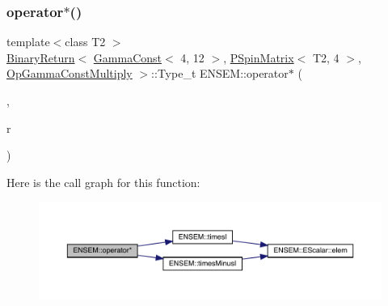 \subsubsection{\texorpdfstring{operator$\ast$()}{operator*()}\hspace{0.1cm}{\footnotesize\ttfamily [13/64]}}
{\footnotesize\ttfamily template$<$class T2 $>$ \\
\mbox{\hyperlink{structENSEM_1_1BinaryReturn}{Binary\+Return}}$<$ \mbox{\hyperlink{classENSEM_1_1GammaConst}{Gamma\+Const}}$<$ 4, 12 $>$, \mbox{\hyperlink{classENSEM_1_1PSpinMatrix}{P\+Spin\+Matrix}}$<$ T2, 4 $>$, \mbox{\hyperlink{structENSEM_1_1OpGammaConstMultiply}{Op\+Gamma\+Const\+Multiply}} $>$\+::Type\+\_\+t E\+N\+S\+E\+M\+::operator$\ast$ (\begin{DoxyParamCaption}\item[{const \mbox{\hyperlink{classENSEM_1_1GammaConst}{Gamma\+Const}}$<$ 4, 12 $>$ \&}]{,  }\item[{const \mbox{\hyperlink{classENSEM_1_1PSpinMatrix}{P\+Spin\+Matrix}}$<$ T2, 4 $>$ \&}]{r }\end{DoxyParamCaption})\hspace{0.3cm}{\ttfamily [inline]}}

Here is the call graph for this function\+:\nopagebreak
\begin{figure}[H]
\begin{center}
\leavevmode
\includegraphics[width=350pt]{d6/df5/group__primspinmatrix_gac3b96a9e74f7c7170ae4c2713382e011_cgraph}
\end{center}
\end{figure}
\mbox{\label{group__primspinmatrix_ga704b99c9b5eb26a1b2d439a1106d809b}} 
